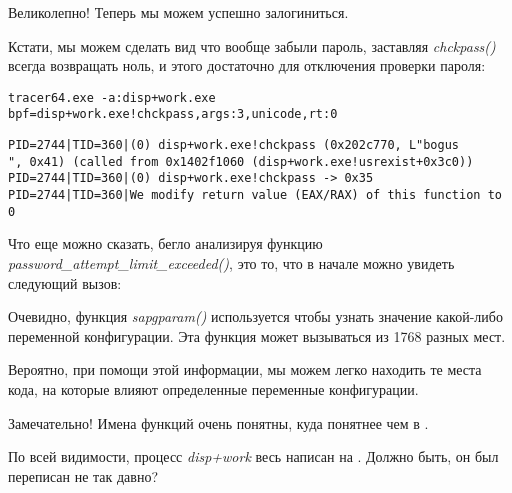 Великолепно! Теперь мы можем успешно залогиниться.

Кстати, мы можем сделать вид что вообще забыли пароль, заставляя \emph{chckpass()} всегда возвращать ноль, и этого достаточно для отключения проверки пароля:

\begin{lstlisting}
tracer64.exe -a:disp+work.exe bpf=disp+work.exe!chckpass,args:3,unicode,rt:0
\end{lstlisting}

\begin{lstlisting}
PID=2744|TID=360|(0) disp+work.exe!chckpass (0x202c770, L"bogus                                   ", 0x41) (called from 0x1402f1060 (disp+work.exe!usrexist+0x3c0))
PID=2744|TID=360|(0) disp+work.exe!chckpass -> 0x35
PID=2744|TID=360|We modify return value (EAX/RAX) of this function to 0
\end{lstlisting}

Что еще можно сказать, бегло анализируя функцию \\
\emph{password\_attempt\_limit\_exceeded()}, это то, что в начале
можно увидеть следующий вызов:



Очевидно, функция \emph{sapgparam()} используется чтобы узнать значение какой-либо переменной конфигурации. Эта функция может вызываться из 1768 разных мест.

Вероятно, при помощи этой информации, мы можем легко находить те места кода, на которые влияют определенные переменные конфигурации.

Замечательно! Имена функций очень понятны, куда понятнее чем в \oracle.
 
\myindex{\Cpp}
По всей видимости, процесс \emph{disp+work} весь написан на \Cpp. Должно быть, он был переписан не так давно?

